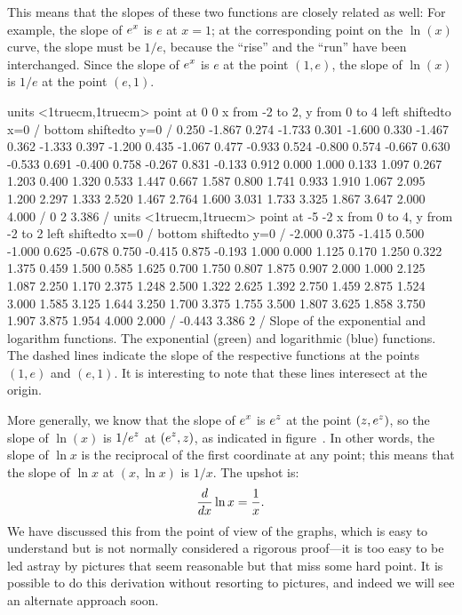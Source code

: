 \noindent 
This means that the slopes of these two functions are closely related
as well: For example, the slope of $\displaystyle e^x$ is $e$ at $x=1$; at the
corresponding point on the $\ln(x)$ curve, the slope must be $1/e$,
because the ``rise'' and the ``run'' have been interchanged. Since the
slope of $\displaystyle e^x$ is $e$ at the point $(1,e)$, the slope of $\ln(x)$ is
$1/e$ at the point $(e,1)$.

\figure
\texonly
\vbox{\beginpicture
\normalgraphs
\ninepoint
\setcoordinatesystem units <1truecm,1truecm> point at 0 0
\setplotarea x from -2 to 2, y from 0 to 4
\axis left shiftedto x=0 /
\axis bottom shiftedto y=0 /
\setquadratic
{} 0.250 -1.867 0.274 -1.733 0.301 -1.600 0.330 -1.467 0.362 
-1.333 0.397 -1.200 0.435 -1.067 0.477 -0.933 0.524 -0.800 0.574 
-0.667 0.630 -0.533 0.691 -0.400 0.758 -0.267 0.831 -0.133 0.912 
0.000 1.000 0.133 1.097 0.267 1.203 0.400 1.320 0.533 1.447 
0.667 1.587 0.800 1.741 0.933 1.910 1.067 2.095 1.200 2.297 
1.333 2.520 1.467 2.764 1.600 3.031 1.733 3.325 1.867 3.647 
2.000 4.000 /
\setlinear
{} 0 2 3.386 /
\setcoordinatesystem units <1truecm,1truecm> point at -5 -2
\setplotarea x from 0 to 4, y from -2 to 2
\axis left shiftedto x=0 /
\axis bottom shiftedto y=0 /
\setquadratic
{} -2.000 0.375 -1.415 0.500 -1.000 0.625 -0.678 0.750 -0.415 
0.875 -0.193 1.000 0.000 1.125 0.170 1.250 0.322 1.375 0.459 
1.500 0.585 1.625 0.700 1.750 0.807 1.875 0.907 2.000 1.000 
2.125 1.087 2.250 1.170 2.375 1.248 2.500 1.322 2.625 1.392 
2.750 1.459 2.875 1.524 3.000 1.585 3.125 1.644 3.250 1.700 
3.375 1.755 3.500 1.807 3.625 1.858 3.750 1.907 3.875 1.954 
4.000 2.000 /
\setlinear
{} -0.443 3.386 2 /
\endpicture}
\begincaption
Slope of the exponential and logarithm functions.
\endcaption
\endtexonly
{}
\htmlonly
\begincaption
The exponential (green) and logarithmic (blue) functions.  The dashed
lines indicate the slope of the respective functions at the points
$(1,e)$ and $(e,1)$.  It is interesting to note that these lines
interesect at the origin.
\endcaption
\endhtmlonly
\endfigure

More generally, we know that the slope of $\displaystyle e^x$ is $\displaystyle e^z$ at
the point $\displaystyle (z,e^z)$, so the slope of $\ln(x)$ is $\displaystyle 1/e^z$ at
$\displaystyle (e^z,z)$, as indicated in figure~.  In other words, the slope of $\ln x$ is the
reciprocal of the first coordinate at any point; this means that the
slope of $\ln x$ at $(x,\ln x)$ is $1/x$. The upshot is:
$${d\over dx}\ln x = {1\over x}.$$
We have discussed this from the point of view of the graphs, which is
easy to understand but is not normally considered a rigorous
proof---it is too easy to be led astray by pictures that seem
reasonable but that miss some hard point. It is possible to do this
derivation without resorting to pictures, and indeed we will see an
alternate approach soon.

